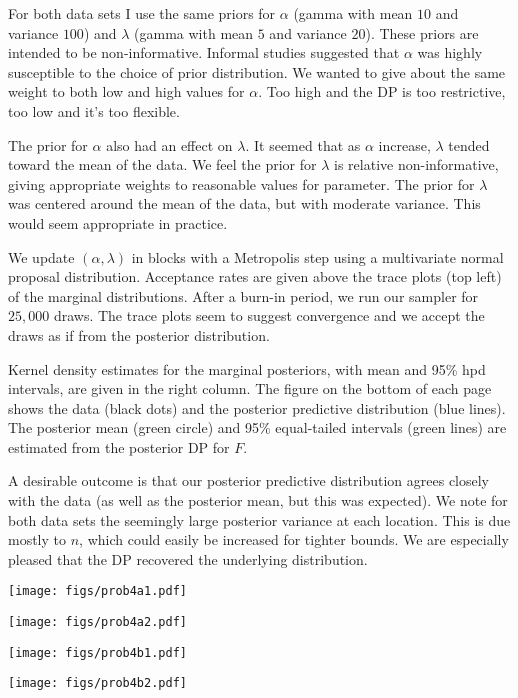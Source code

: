 \documentclass[12pt]{article}
\begin{document}
\noindent For both data sets I use the same priors for $\alpha$ (gamma with mean $10$ and variance $100$) and $\lambda$ (gamma with mean $5$ and variance $20$). These priors are intended to be non-informative. Informal studies suggested that $\alpha$ was highly susceptible to the choice of prior distribution. We wanted to give about the same weight to both low and high values for $\alpha$. Too high and the DP is too restrictive, too low and it's too flexible.
\bigskip

\noindent The prior for $\alpha$ also had an effect on $\lambda$. It seemed that as $\alpha$ increase, $\lambda$ tended toward the mean of the data. We feel the prior for $\lambda$ is relative non-informative, giving appropriate weights to reasonable values for parameter. The prior for $\lambda$ was centered around the mean of the data, but with moderate variance. This would seem appropriate in practice.
\bigskip

\noindent We update $(\alpha, \lambda)$ in blocks with a Metropolis step using a multivariate normal proposal distribution. Acceptance rates are given above the trace plots (top left) of the marginal distributions. After a burn-in period, we run our sampler for $25,000$ draws. The trace plots seem to suggest convergence and we accept the draws as if from the posterior distribution.
\bigskip

\noindent Kernel density estimates for the marginal posteriors, with mean and 95\% hpd intervals, are given in the right column. The figure on the bottom of each page shows the data (black dots) and the posterior predictive distribution (blue lines). The posterior mean (green circle) and 95\% equal-tailed intervals (green lines) are estimated from the posterior DP for $F$.
\bigskip

\noindent A desirable outcome is that our posterior predictive distribution agrees closely with the data (as well as the posterior mean, but this was expected). We note for both data sets the seemingly large posterior variance at each location. This is due mostly to $n$, which could easily be increased for tighter bounds. We are especially pleased that the DP recovered the underlying distribution.

\newpage

\begin{center}
\texttt{[image: figs/prob4a1.pdf]}
\end{center}

\begin{center}
\texttt{[image: figs/prob4a2.pdf]}
\end{center}

\newpage

\begin{center}
\texttt{[image: figs/prob4b1.pdf]}
\end{center}

\begin{center}
\texttt{[image: figs/prob4b2.pdf]}
\end{center}
\end{document}
